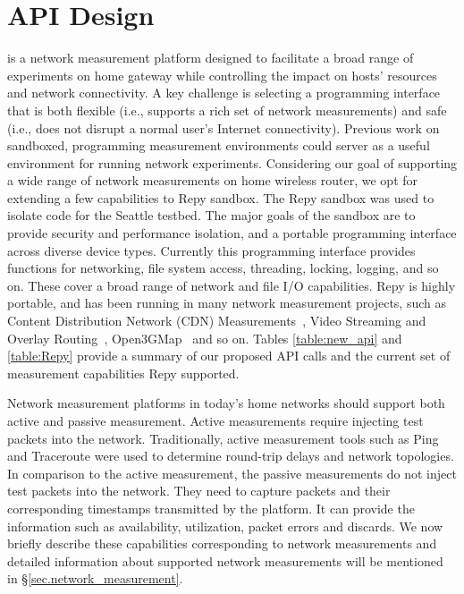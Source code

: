 \section{API Design}
{\raggedright
\sysname is a network measurement platform designed to facilitate a broad range of experiments on home gateway while controlling the impact on hosts' resources and network connectivity. A key challenge is selecting a programming interface that is both flexible (i.e., supports a rich set of network measurements) and safe (i.e., does not disrupt a normal user's Internet connectivity). Previous work on sandboxed, programming measurement environments \sysname could server as a useful environment for running network experiments. Considering our goal of supporting a wide range of network measurements on home wireless router, we opt for extending a few capabilities to Repy sandbox\cite{cappos2010retaining}. The Repy sandbox was used to isolate code for the Seattle testbed. The major goals of the sandbox are to provide security and performance isolation, and a portable programming interface across diverse device types. Currently this programming interface provides functions for networking, file system access, threading, locking, logging, and so on. These cover a broad range of network and file I/O capabilities. Repy is highly portable, and has been running in many network measurement projects, such as Content Distribution Network (CDN) Measurements~\cite{rafetseder2011exploring}, Video Streaming and Overlay Routing~\cite{eisl2011service}, Open3GMap~\cite{open3gmap} and so on. Tables \ref{table:new_api} and \ref{table:Repy} provide a summary of our proposed API calls and the current set of measurement capabilities Repy supported. 

Network measurement platforms in today's home networks should support both active and passive measurement. Active measurements require injecting test packets into the network. Traditionally, active measurement tools such as Ping\cite{ping} and Traceroute\cite{traceroute} were used to determine round-trip delays and network topologies. In comparison to the active measurement, the passive measurements do not inject test packets into the network. They need to capture packets and their corresponding timestamps transmitted by the platform. It can provide the information such as availability, utilization, packet errors and discards\cite{calyamactive}. We now briefly describe these capabilities corresponding to network measurements and detailed information about supported network measurements will be mentioned in \S{\ref{sec.network_measurement}}.

}
